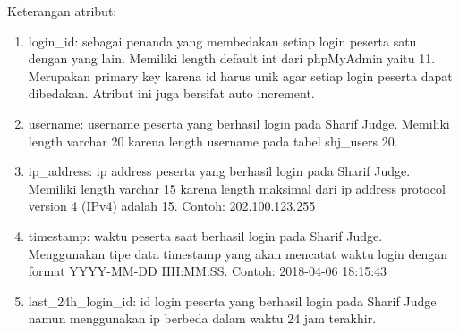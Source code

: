 Keterangan atribut:
\begin{enumerate}
	\item login\_id: sebagai penanda yang membedakan setiap login peserta satu dengan yang lain. Memiliki length default int dari phpMyAdmin yaitu 11. Merupakan primary key karena id harus unik agar setiap login peserta dapat dibedakan. Atribut ini juga bersifat auto increment.
	\item username: username peserta yang berhasil login pada Sharif Judge. Memiliki length varchar 20 karena length username pada tabel shj\_users 20.
	\item ip\_address: ip address peserta yang berhasil login pada Sharif Judge. Memiliki length varchar 15 karena length maksimal dari ip address protocol version 4 (IPv4) adalah 15. Contoh: 202.100.123.255
	\item timestamp: waktu peserta saat berhasil login pada Sharif Judge. Menggunakan tipe data timestamp yang akan mencatat waktu login dengan format YYYY-MM-DD HH:MM:SS. Contoh: 2018-04-06 18:15:43
	\item last\_24h\_login\_id: id login peserta yang berhasil login pada Sharif Judge namun menggunakan ip berbeda dalam waktu 24 jam terakhir.
\end{enumerate}

